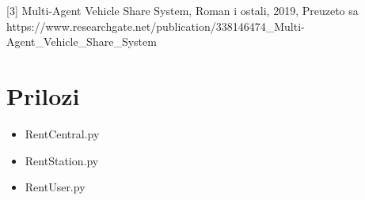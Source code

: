 \documentclass{foi}
\begin{document}
[3] Multi-Agent Vehicle Share System, Roman i ostali, 2019, Preuzeto sa https://www.researchgate.net/publication/338146474\_Multi-Agent\_Vehicle\_Share\_System

\printbibliography[title=Popis literature]

\listoffigures
{}

\appendix
\renewcommand{\thechapter}{\arabic{chapter}}

\chapter{Prilozi}

\begin{itemize}
    \item RentCentral.py
    
    \item RentStation.py
    
    \item RentUser.py
\end{itemize}
\end{document}
